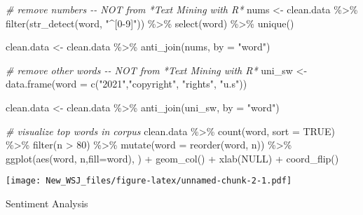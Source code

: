 \documentclass[
]{article}
\newenvironment{Shaded}{\begin{snugshade}}{\end{snugshade}}
\newcommand{\AttributeTok}[1]{\textcolor[rgb]{0.77,0.63,0.00}{#1}}
\newcommand{\CommentTok}[1]{\textcolor[rgb]{0.56,0.35,0.01}{\textit{#1}}}
\newcommand{\ConstantTok}[1]{\textcolor[rgb]{0.00,0.00,0.00}{#1}}
\newcommand{\DecValTok}[1]{\textcolor[rgb]{0.00,0.00,0.81}{#1}}
\newcommand{\FunctionTok}[1]{\textcolor[rgb]{0.00,0.00,0.00}{#1}}
\newcommand{\NormalTok}[1]{#1}
\newcommand{\OtherTok}[1]{\textcolor[rgb]{0.56,0.35,0.01}{#1}}
\newcommand{\SpecialCharTok}[1]{\textcolor[rgb]{0.00,0.00,0.00}{#1}}
\newcommand{\StringTok}[1]{\textcolor[rgb]{0.31,0.60,0.02}{#1}}
\begin{document}
\begin{Shaded}
\begin{Highlighting}[]
\CommentTok{\# remove numbers {-}{-} NOT from *Text Mining with R*}
\NormalTok{nums }\OtherTok{\textless{}{-}}\NormalTok{ clean.data }\SpecialCharTok{\%\textgreater{}\%} \FunctionTok{filter}\NormalTok{(}\FunctionTok{str\_detect}\NormalTok{(word, }\StringTok{"\^{}[0{-}9]"}\NormalTok{)) }\SpecialCharTok{\%\textgreater{}\%} \FunctionTok{select}\NormalTok{(word) }\SpecialCharTok{\%\textgreater{}\%} \FunctionTok{unique}\NormalTok{()}

\NormalTok{clean.data }\OtherTok{\textless{}{-}}\NormalTok{ clean.data }\SpecialCharTok{\%\textgreater{}\%}
  \FunctionTok{anti\_join}\NormalTok{(nums, }\AttributeTok{by =} \StringTok{"word"}\NormalTok{)}

\CommentTok{\# remove other words {-}{-} NOT from *Text Mining with R*}
\NormalTok{uni\_sw }\OtherTok{\textless{}{-}} \FunctionTok{data.frame}\NormalTok{(}\AttributeTok{word =} \FunctionTok{c}\NormalTok{(}\StringTok{"2021"}\NormalTok{,}\StringTok{"copyright"}\NormalTok{, }\StringTok{"rights"}\NormalTok{, }\StringTok{"u.s"}\NormalTok{))}

\NormalTok{clean.data }\OtherTok{\textless{}{-}}\NormalTok{ clean.data }\SpecialCharTok{\%\textgreater{}\%}
  \FunctionTok{anti\_join}\NormalTok{(uni\_sw, }\AttributeTok{by =} \StringTok{"word"}\NormalTok{)}

\CommentTok{\# visualize top words in corpus}
\NormalTok{clean.data }\SpecialCharTok{\%\textgreater{}\%}
  \FunctionTok{count}\NormalTok{(word, }\AttributeTok{sort =} \ConstantTok{TRUE}\NormalTok{) }\SpecialCharTok{\%\textgreater{}\%}
  \FunctionTok{filter}\NormalTok{(n }\SpecialCharTok{\textgreater{}} \DecValTok{80}\NormalTok{) }\SpecialCharTok{\%\textgreater{}\%}
  \FunctionTok{mutate}\NormalTok{(}\AttributeTok{word =} \FunctionTok{reorder}\NormalTok{(word, n)) }\SpecialCharTok{\%\textgreater{}\%}
  \FunctionTok{ggplot}\NormalTok{(}\FunctionTok{aes}\NormalTok{(word, n,}\AttributeTok{fill=}\NormalTok{word), ) }\SpecialCharTok{+}
  \FunctionTok{geom\_col}\NormalTok{() }\SpecialCharTok{+}
  \FunctionTok{xlab}\NormalTok{(}\ConstantTok{NULL}\NormalTok{) }\SpecialCharTok{+}
  \FunctionTok{coord\_flip}\NormalTok{()}
\end{Highlighting}
\end{Shaded}

\texttt{[image: New\_WSJ\_files/figure-latex/unnamed-chunk-2-1.pdf]}

Sentiment Analysis
\end{document}
